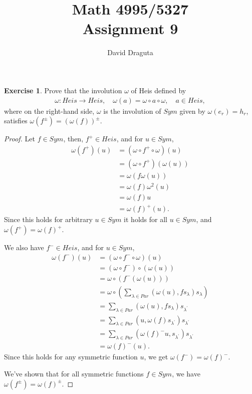 \documentclass[12pt]{extarticle}
\title{ Math 4995/5327
  \\
  Assignment 9}
\author{David Draguta}
\newcommand{\<}{\langle}
\renewcommand{\>}{\rangle}
\theoremstyle{definition}
\newtheorem{exercise}{Exercise}
\begin{document}
\maketitle

\begin{exercise}
  Prove that the involution $\omega$ of Heis defined by
  \begin{align*}
    \omega: Heis \to Heis, \quad \omega(a)= \omega \circ a \circ \omega, \quad a \in Heis,
  \end{align*}
  where on the right-hand side, $\omega$ is the involution of $Sym$ given by $\omega(e_r) = h_r$, satisfies $\omega(f^{\pm}) = (\omega(f))^{\pm}$.
\end{exercise}
\begin{proof}
  Let $f \in Sym$, then, $f^+ \in Heis$, and for $u \in Sym$, 
  \begin{align*}
    \omega(f^+)(u)
    &=
    (\omega \circ f^+ \circ \omega)(u) \\
    &=
    (\omega \circ f^+) (\omega(u)) \\
    &=
    \omega ( f\omega(u)) \\
    &=
    \omega(f)\omega^2(u) \\
    &=
    \omega(f)u \\
    &=\omega(f)^+(u).
  \end{align*}
  Since this holds for arbitrary $u \in Sym$ it holds for all $u \in Sym$, and $\omega(f^+) = \omega(f)^+$.

  We also have $f^- \in Heis$, and for $u \in Sym$,
  \begin{align*}
    \omega(f^-)(u)
    &=
    (\omega \circ f^- \circ \omega)(u) \\
    &=
    (\omega \circ f^-) \circ (\omega(u)) \\
    &=
    \omega \circ (f^-(\omega(u))) \\
    &=
    \omega \circ (\sum\limits_{\lambda \in Par} (\omega(u), fs_\lambda)s_\lambda) \\
    &=
    \sum\limits_{\lambda \in Par} (\omega(u), fs_\lambda)s_{\lambda^'} \\
    &=
    \sum\limits_{\lambda \in Par} (u, \omega(f)s_{\lambda^{'}}) s_{\lambda^'} \\
    &=
    \sum\limits_{\lambda \in Par} ({\omega(f)}^-u, s_{\lambda^{'}}) s_{\lambda^{'}} \\
    &=
    {\omega(f)}^-(u).
  \end{align*}
  Since this holds for any symmetric function $u$, we get $\omega(f^-) = \omega(f)^-$.

  We've shown that for all symmetric functions $f \in Sym$, we have $\omega(f^{\pm}) = \omega(f)^{\pm}$. 
\end{proof}
\end{document}

